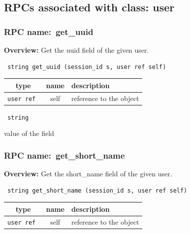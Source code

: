 \subsection{RPCs associated with class: user}
\subsubsection{RPC name:~get\_uuid}

{\bf Overview:} 
Get the uuid field of the given user.

\begin{verbatim} string get_uuid (session_id s, user ref self)\end{verbatim}



 
\vspace{0.3cm}
\begin{tabular}{|c|c|p{7cm}|}
 \hline
{\bf type} & {\bf name} & {\bf description} \\ \hline
{\tt user ref } & self & reference to the object \\ \hline 

\end{tabular}

\vspace{0.3cm}

{\tt 
string
}


value of the field
\vspace{0.3cm}
\vspace{0.3cm}
\vspace{0.3cm}
\subsubsection{RPC name:~get\_short\_name}

{\bf Overview:} 
Get the short\_name field of the given user.

\begin{verbatim} string get_short_name (session_id s, user ref self)\end{verbatim}



 
\vspace{0.3cm}
\begin{tabular}{|c|c|p{7cm}|}
 \hline
{\bf type} & {\bf name} & {\bf description} \\ \hline
{\tt user ref } & self & reference to the object \\ \hline 

\end{tabular}

